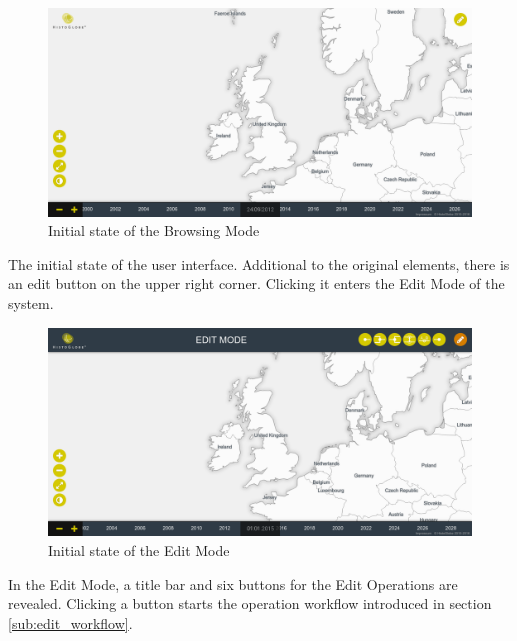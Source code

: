 \newpage
\begin{minipage}[t]{0.47\textwidth}

  \begin{figure}[H]
    \centering
    \includegraphics[width=1.0\textwidth]{graphics/development/final_interface/1_init.png}
    \caption{Initial state of the Browsing Mode}
    \label{fig:final_1_init}
  \end{figure}

  The initial state of the user interface. Additional to the original elements, there is an edit button on the upper right corner. Clicking it enters the Edit Mode of the system.

\end{minipage}    %
\hspace{1.5em}    %
\begin{minipage}[t]{0.47\textwidth}

  \begin{figure}[H]
    \centering
    \includegraphics[width=1.0\textwidth]{graphics/development/final_interface/2_edit_mode.png}
    \caption{Initial state of the Edit Mode}
    \label{fig:final_2_edit_mode}
  \end{figure}

  In the Edit Mode, a title bar and six buttons for the Edit Operations are   revealed. Clicking a button starts the operation workflow introduced in section \ref{sub:edit_workflow}.

\end{minipage}

